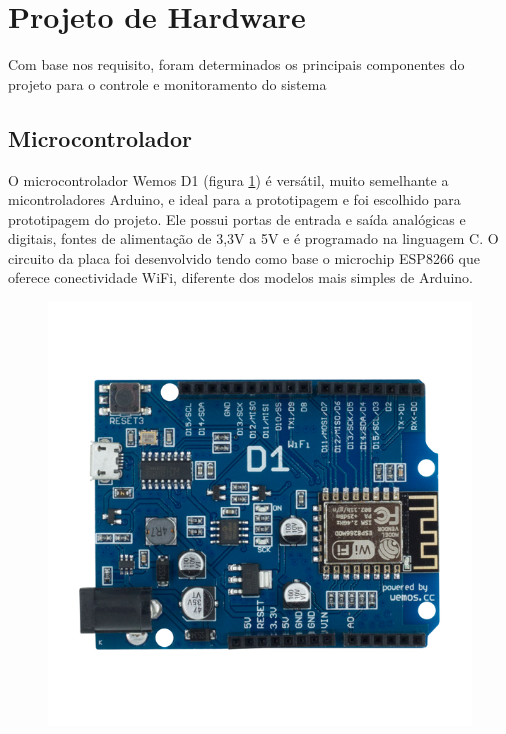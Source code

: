 \section{Projeto de Hardware}


Com base nos requisito, foram determinados os principais componentes do projeto
para o controle e monitoramento do sistema

\subsection{Microcontrolador}

O microcontrolador Wemos D1 (figura \ref{fig:wemos}) é versátil, muito semelhante a micontroladores Arduino, e ideal para a prototipagem e foi escolhido para prototipagem do projeto. Ele possui portas de entrada e saída analógicas e digitais, fontes de alimentação de 3,3V a 5V e é programado na linguagem C. O circuito da placa foi desenvolvido tendo como base o microchip ESP8266 que oferece conectividade WiFi, diferente dos modelos mais simples de Arduino.

\begin{figure}[h]
    \centering
    \includegraphics[scale=0.40]{figuras/projeto/hardware/wemos_d1.png}
    \label{fig:wemos}
\end{figure}

